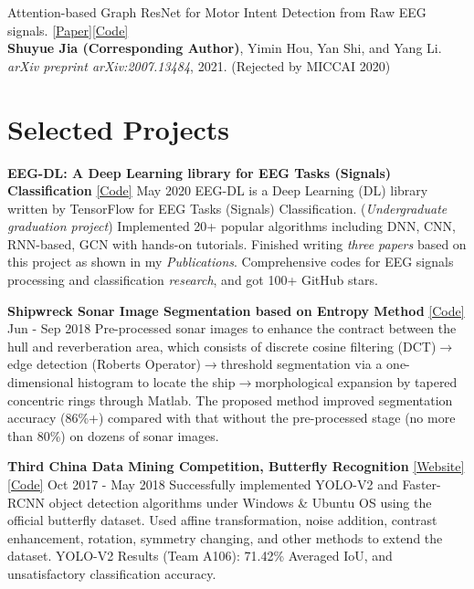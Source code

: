 \documentclass{my_cv}
\begin{document}
\hspace*{\fill}

\workitemsone
{Attention-based Graph ResNet for Motor Intent Detection from Raw EEG signals. \href{https://arxiv.org/abs/2007.13484}{[Paper]}\href{https://github.com/SuperBruceJia/EEG-DL}{[Code]}\\
	\textbf{Shuyue Jia (Corresponding Author)}, Yimin Hou, Yan Shi, and Yang Li.\\
	\emph{arXiv preprint arXiv:2007.13484}, 2021. (Rejected by MICCAI 2020)}

\hspace*{\fill}

\section{Selected Projects}
\noindent \textbf{EEG-DL: A Deep Learning library for EEG Tasks (Signals) Classification} \href{https://github.com/SuperBruceJia/EEG-DL}{[Code]} \hfill May 2020 
\workitemsfour
{EEG-DL is a Deep Learning (DL) library written by TensorFlow for EEG Tasks (Signals) Classification. (\emph{Undergraduate graduation project})}
{Implemented 20+ popular algorithms including DNN, CNN, RNN-based, GCN with hands-on tutorials.}
{Finished writing \emph{three papers} based on this project as shown in my \emph{Publications}.}
{Comprehensive codes for EEG signals processing and classification \emph{research}, and got 100+ GitHub stars.}

\hspace*{\fill} 

\noindent \textbf{Shipwreck Sonar Image Segmentation based on Entropy Method} \href{https://github.com/SuperBruceJia/Sonar-Image-Segmentation-through-Entropy-Method}{[Code]} \hfill Jun - Sep 2018 
\workitemstwo
{Pre-processed sonar images to enhance the contract between the hull and reverberation area, which consists of discrete cosine filtering (DCT)$\rightarrow$edge detection (Roberts Operator)$\rightarrow$threshold segmentation via a one-dimensional histogram to locate the ship$\rightarrow$morphological expansion by tapered concentric rings through Matlab.}
{The proposed method improved segmentation accuracy (86\%+) compared with that without the pre-processed stage (no more than 80\%) on dozens of sonar images.}

\hspace*{\fill} 

\noindent \textbf{Third China Data Mining Competition, Butterfly Recognition} \href{https://ccdm2018.sdufe.edu.cn/info/1012/1212.htm}{[Website]}  \href{https://github.com/SuperBruceJia/YOLO-V2-Object-Detection-Implementation}{[Code]} \hfill Oct 2017 - May 2018 
\workitemsthree
{Successfully implemented YOLO-V2 and Faster-RCNN object detection algorithms under Windows \& Ubuntu OS using the official butterfly dataset.}
{Used affine transformation, noise addition, contrast enhancement, rotation, symmetry changing, and other methods to extend the dataset.}
{YOLO-V2 Results (Team A106): 71.42\% Averaged IoU, and unsatisfactory classification accuracy.}
\end{document}
